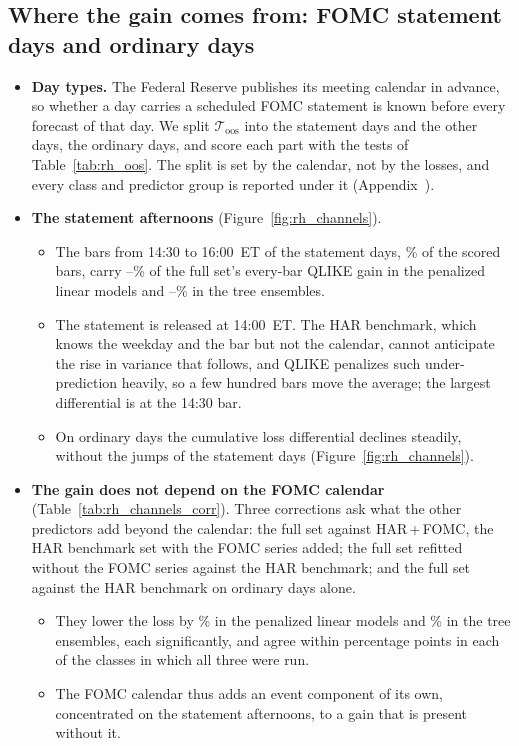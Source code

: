 \subsection{Where the gain comes from: FOMC statement days and ordinary days}
\label{sec:rh_results_channels}
\begin{itemize}
\item \textbf{Day types.} The Federal Reserve publishes its meeting calendar in advance, so whether a day carries a
  scheduled FOMC statement is known before every forecast of that day. We split $\mathcal T_{\mathrm{oos}}$ into the
  \rhchNEventDays{} statement days and the \rhchNOrdDays{} other days, the ordinary days, and score each part with the
  tests of Table~\ref{tab:rh_oos}. The split is set by the calendar, not by the losses, and every class and predictor
  group is reported under it (Appendix~).
\item \textbf{The statement afternoons} (Figure~\ref{fig:rh_channels}).
  \begin{itemize}
  \item The bars from 14:30 to 16:00~ET of the statement days, \rhchEventPmBarPct\% of the scored bars, carry
    \rhchLinShareEventPmMin--\rhchLinShareEventPmMax\% of the full set's every-bar QLIKE gain in the penalized linear
    models and \rhchTreeShareEventPmMin--\rhchTreeShareEventPmMax\% in the tree ensembles.
  \item The statement is released at 14:00~ET. The HAR benchmark, which knows the weekday and the bar but not the
    calendar, cannot anticipate the rise in variance that follows, and QLIKE penalizes such under-prediction heavily,
    so a few hundred bars move the average; the largest differential is at the 14:30 bar.
  \item On ordinary days the cumulative loss differential declines steadily, without the jumps of the statement days
    (Figure~\ref{fig:rh_channels}).
  \end{itemize}
\item \textbf{The gain does not depend on the FOMC calendar} (Table~\ref{tab:rh_channels_corr}). Three corrections ask
  what the other predictors add beyond the calendar: the full set against HAR\,+\,FOMC, the HAR benchmark set with the
  FOMC series added; the full set refitted without the FOMC series against the HAR benchmark; and the full set against
  the HAR benchmark on ordinary days alone.
  \begin{itemize}
  \item They lower the loss by \% in the penalized linear models and
    \% in the tree ensembles, each significantly, and agree within \rhchAgreePp{}
    percentage points in each of the \rhchNCorrAgree{} classes in which all three were run.
  \item The FOMC calendar thus adds an event component of its own, concentrated on the statement afternoons, to a
    gain that is present without it.
  \end{itemize}
\end{itemize}

